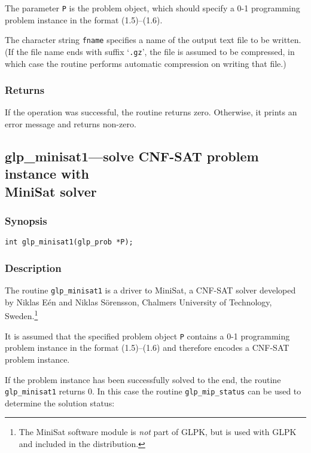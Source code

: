 \documentclass[11pt,draft]{article}
\begin{document}
The parameter \verb|P| is the problem object, which should specify
a 0-1 programming problem instance in the format (1.5)--(1.6).

The character string \verb|fname| specifies a name of the output text
file to be written. (If the file name ends with suffix `\verb|.gz|',
the file is assumed to be compressed, in which case the routine
performs automatic compression on writing that file.)

\subsubsection*{Returns}

If the operation was successful, the routine returns zero. Otherwise,
it prints an error message and returns non-zero.

\newpage

\subsection{glp\_minisat1---solve CNF-SAT problem instance with\\
MiniSat solver}

\subsubsection*{Synopsis}

\begin{verbatim}
int glp_minisat1(glp_prob *P);
\end{verbatim}

\subsubsection*{Description}

The routine \verb|glp_minisat1| is a driver to MiniSat, a CNF-SAT
solver developed by Niklas E\'en and Niklas S\"orensson, Chalmers
University of Technology, Sweden.\footnote{The MiniSat software module
is {\it not} part of GLPK, but is used with GLPK and included in the
distribution.}

It is assumed that the specified problem object \verb|P| contains
a 0-1 programming problem instance in the format (1.5)--(1.6) and
therefore encodes a CNF-SAT problem instance.

If the problem instance has been successfully solved to the end, the
routine \verb|glp_minisat1| returns 0. In this case the routine
\verb|glp_mip_status| can be used to determine the solution status:
\end{document}
